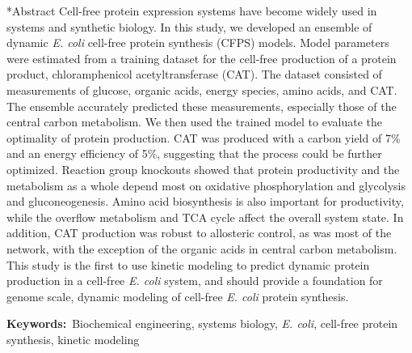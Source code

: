 \documentclass[12pt]{article}
\makeatletter
\renewcommand\section{\@startsection
	{subsection}{2}{0mm}
	{-0.2in}
	{0.05\baselineskip}
	{\normalfont\large\bfseries}}
\makeatother
\begin{document}
\section*{Abstract}
Cell-free protein expression systems have become widely used in systems and synthetic biology.
In this study, we developed an ensemble of dynamic \textit{E. coli} cell-free protein synthesis (CFPS) models.
Model parameters were estimated from a training dataset for the cell-free production of a protein product, chloramphenicol acetyltransferase (CAT).
The dataset consisted of measurements of glucose, organic acids, energy species, amino acids, and CAT.
The ensemble accurately predicted these measurements, especially those of the central carbon metabolism.
We then used the trained model to evaluate the optimality of protein production.
CAT was produced with a carbon yield of 7\% and an energy efficiency of 5\%, suggesting that the process could be further optimized.
Reaction group knockouts showed that protein productivity and the metabolism as a whole depend most on oxidative phosphorylation and glycolysis and gluconeogenesis.
Amino acid biosynthesis is also important for productivity, while the overflow metabolism and TCA cycle affect the overall system state.
In addition, CAT production was robust to allosteric control, as was most of the network, with the exception of the organic acids in central carbon metabolism.
This study is the first to use kinetic modeling to predict dynamic protein production in a cell-free \textit{E. coli} system, and should provide a foundation for genome scale, dynamic modeling of cell-free \textit{E. coli} protein synthesis.

\vspace{0.1in}
{\noindent \textbf{Keywords:}~Biochemical engineering, systems biology, \textit{E. coli}, cell-free protein synthesis, kinetic modeling}

\pagebreak

\setcounter{page}{1}

\end{document}
